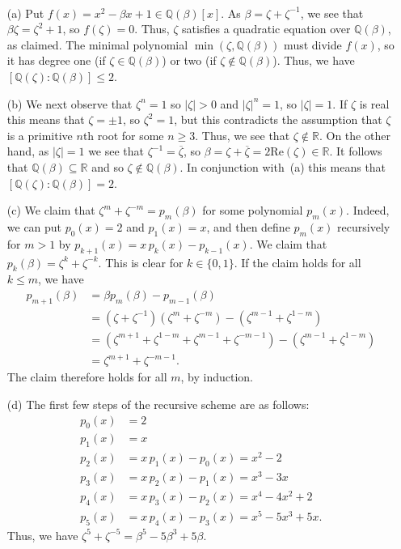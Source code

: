 \documentclass{amsart}
\newcommand{\Q}         {{\mathbb{Q}}}
\newcommand{\R}         {{\mathbb{R}}}
\newcommand{\bt}        {\beta}
\newcommand{\zt}        {\zeta}
\newcommand{\ov}[1]     {\overline{#1}}
\newcommand{\sse}       {\subseteq}
\renewcommand{\:}{\colon}
\newenvironment{solution}{\SolutionInline}{\endSolutionInline}
\theoremstyle{definition}
\renewenvironment{solution}{\SolutionAtEnd}{\endSolutionAtEnd}
\begin{document}
\begin{solution}\ \\
 \begin{itemize}
  \item[(a)] Put $f(x)=x^2-\bt x+1\in\Q(\bt)[x]$.  As
   $\bt=\zt+\zt^{-1}$, we see that $\bt\zt=\zt^2+1$, so $f(\zt)=0$.
   Thus, $\zt$ satisfies a quadratic equation over $\Q(\bt)$, as
   claimed.  The minimal polynomial $\min(\zt,\Q(\bt))$ must divide
   $f(x)$, so it has degree one (if $\zt\in\Q(\bt)$) or two (if
   $\zt\not\in\Q(\bt)$).  Thus, we have $[\Q(\zt):\Q(\bt)]\leq 2$.

  \item[(b)] We next observe that $\zt^n=1$ so $|\zt|>0$ and
   $|\zt|^n=1$, so $|\zt|=1$.  If $\zt$ is real this means that
   $\zt=\pm 1$, so $\zt^2=1$, but this contradicts the assumption that
   $\zt$ is a primitive $n$th root for some $n\geq 3$.  Thus, we see
   that $\zt\not\in\R$.  On the other hand, as $|\zt|=1$ we see that
   $\zt^{-1}=\ov{\zt}$, so $\bt=\zt+\ov{\zt}=2\text{Re}(\zt)\in\R$.
   It follows that $\Q(\bt)\sse\R$ and so $\zt\not\in\Q(\bt)$.  In
   conjunction with~(a) this means that $[\Q(\zt):\Q(\bt)]=2$.

  \item[(c)] We claim that $\zt^m+\zt^{-m}=p_m(\bt)$ for some
   polynomial $p_m(x)$.  Indeed, we can put $p_0(x)=2$ and $p_1(x)=x$,
   and then define $p_m(x)$ recursively for $m>1$ by
   $p_{k+1}(x)=x\,p_k(x)-p_{k-1}(x)$.  We claim that
   $p_k(\bt)=\zt^k+\zt^{-k}$.  This is clear for $k\in\{0,1\}$.  If
   the claim holds for all $k\leq m$, we have 
   \begin{align*}
    p_{m+1}(\bt) &= 
     \bt p_m(\bt) - p_{m-1}(\bt) \\
     &= (\zt+\zt^{-1})(\zt^m+\zt^{-m}) - (\zt^{m-1}+\zt^{1-m}) \\
     &= (\zt^{m+1}+\zt^{1-m}+\zt^{m-1}+\zt^{-m-1}) - 
         (\zt^{m-1}+\zt^{1-m}) \\
     &= \zt^{m+1}+\zt^{-m-1}.
   \end{align*}
   The claim therefore holds for all $m$, by induction.
  
  \item[(d)] The first few steps of the recursive scheme are as
   follows:
   \begin{align*}
    p_0(x) &= 2 \\
    p_1(x) &= x \\
    p_2(x) &= x\,p_1(x) - p_0(x) = x^2-2 \\
    p_3(x) &= x\,p_2(x) - p_1(x) = x^3-3x \\
    p_4(x) &= x\,p_3(x) - p_2(x) = x^4-4x^2+2 \\
    p_5(x) &= x\,p_4(x) - p_3(x) = x^5-5x^3+5x.
   \end{align*}
   Thus, we have $\zt^5+\zt^{-5}=\bt^5-5\bt^3+5\bt$.
 \end{itemize} 
\end{solution}
\end{document}
